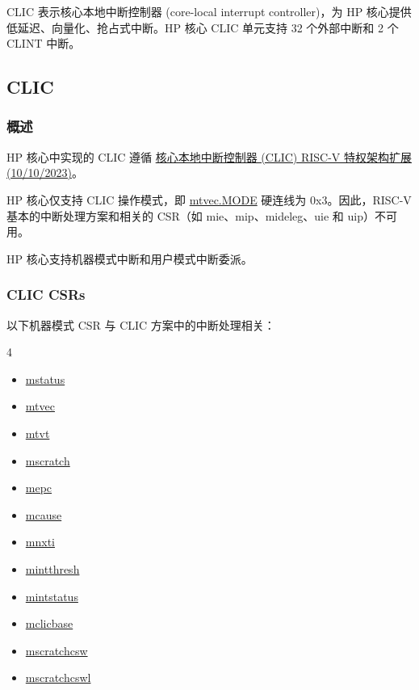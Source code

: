 \documentclass[main\_\_CN.tex]{subfiles}
\begin{document}
CLIC 表示核心本地中断控制器 (core-local interrupt controller)，为 HP 核心提供低延迟、向量化、抢占式中断。HP 核心 CLIC 单元支持 32 个外部中断和 2 个 CLINT 中断。


\subsection{CLIC}
\label{sec:riscvcpu-clic}

\subsubsection{概述}
\label{sec:riscvcpu-clic-overview}


HP 核心中实现的 CLIC 遵循 \href{https://github.com/riscv/riscv-fast-interrupt/blob/v0.9/src/clic.adoc}{核心本地中断控制器 (CLIC) RISC-V 特权架构扩展 (10/10/2023)}。

HP 核心仅支持 CLIC 操作模式，即 \hyperref[fielddesc:MTVECMODE]{mtvec.MODE} 硬连线为 0x3。因此，RISC-V 基本的中断处理方案和相关的 CSR（如 mie、mip、mideleg、uie 和 uip）不可用。

HP 核心支持机器模式中断和用户模式中断委派。

\subsubsection{CLIC CSRs}
\label{sec:riscvcpu-clic-csrs}

以下机器模式 CSR 与 CLIC 方案中的中断处理相关：

\begin{multicols}{4}
\begin{itemize}
\item \hyperref[regdesc:MSTATUS]{mstatus}
\item \hyperref[regdesc:MTVEC]{mtvec}
\item \hyperref[regdesc:MTVT]{mtvt}
\item \hyperref[regdesc:MSCRATCH]{mscratch}
\item \hyperref[regdesc:MEPC]{mepc}
\item \hyperref[regdesc:MCAUSE]{mcause}
\item \hyperref[regdesc:MNXTI_REG]{mnxti}
\item \hyperref[regdesc:MINTTHRESH]{mintthresh}
\item \hyperref[regdesc:MINTSTATUS]{mintstatus}
\item \hyperref[regdesc:MCLICBASE_REG]{mclicbase}
\item \hyperref[regdesc:MSCRATCHCSW_REG]{mscratchcsw}
\item \hyperref[regdesc:MSCRATCHCSWL_REG]{mscratchcswl}
\end{itemize}
\end{multicols}
\end{document}
